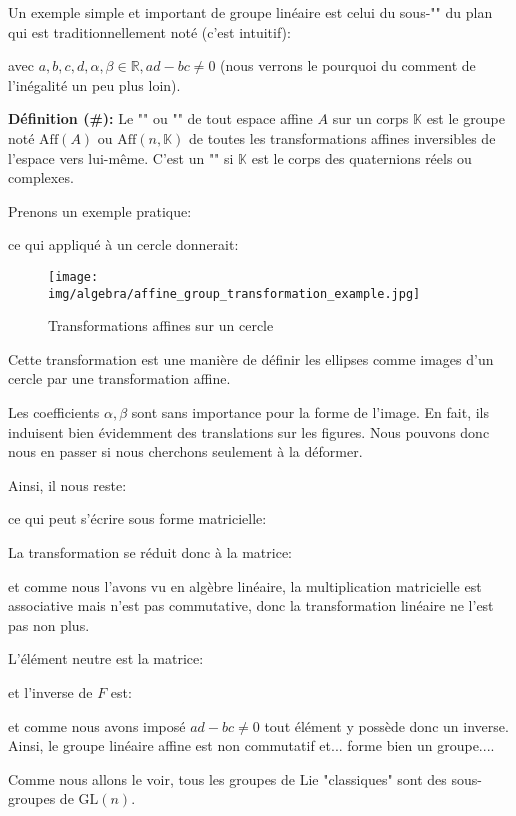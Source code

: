 	Un exemple simple et important de groupe linéaire est celui du sous-"" du plan qui est traditionnellement noté (c'est intuitif):
	
	avec  $a,b,c,d,\alpha,\beta\in \mathbb{R},ad-bc\neq 0$ (nous verrons le pourquoi du comment de l'inégalité un peu plus loin).
	
	\textbf{Définition (\#\mydef):} Le "" ou "" de tout espace affine $A$ sur un corps $\mathbb{K}$ est le groupe noté $\text{Aff}(A)$ ou $\text{Aff}(n,\mathbb{K})$ de toutes les transformations affines inversibles de l'espace vers lui-même. C'est un "" si $\mathbb{K}$ est le corps des quaternions réels ou complexes.
	
	Prenons un exemple pratique:
	
	ce qui appliqué à un cercle donnerait:
	\begin{figure}[H]
		\centering
		\texttt{[image: img/algebra/affine\_group\_transformation\_example.jpg]}
		\caption{Transformations affines sur un cercle}
	\end{figure}
	Cette transformation est une manière de définir les ellipses comme images d'un cercle par une transformation affine.
	
	Les coefficients $\alpha,\beta$ sont sans importance pour la forme de l'image. En fait, ils induisent bien évidemment des translations sur les figures. Nous pouvons donc nous en passer si nous cherchons seulement à la déformer.
	
	Ainsi, il nous reste:
	
	ce qui peut s'écrire sous forme matricielle:
	
	La transformation se réduit donc à la matrice:
	
	et comme nous l'avons vu en algèbre linéaire, la multiplication matricielle est associative mais n'est pas commutative, donc la transformation linéaire ne l'est pas non plus. 
	
	L'élément neutre est la matrice:
	
	et l'inverse de $F$ est:
	
	et comme nous avons imposé $ad-bc\neq 0$ tout élément y possède donc un inverse. Ainsi, le groupe linéaire affine est non commutatif et... forme bien un groupe....
	
	Comme nous allons le voir, tous les groupes de Lie "classiques" sont des sous-groupes de $\text{GL}(n)$.
	
